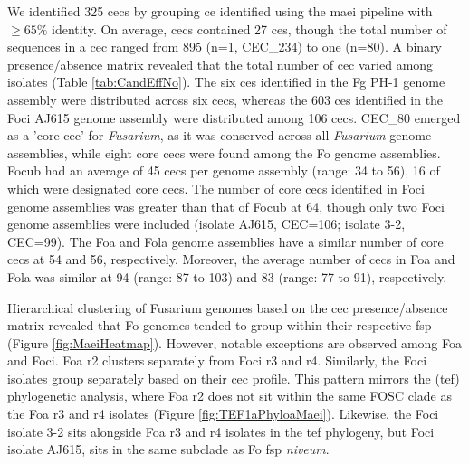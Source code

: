 We identified 325 \acfp{cec} by grouping \ac{ce} identified using the \ac{maei} pipeline with $\geq65\% $ identity. On average, \acp{cec} contained 27 \acp{ce}, though the total number of sequences in a \ac{cec} ranged from 895 (n=1, CEC\_234) to one (n=80). A binary presence/absence matrix revealed that the total number of \ac{cec} varied among isolates (Table \ref{tab:CandEffNo}). The six \acp{ce} identified in the \ac{Fg} PH-1 genome assembly were distributed across six \acp{cec}, whereas the 603 \acp{ce} identified in the \ac{Foci} AJ615 genome assembly were distributed among 106 \acp{cec}. CEC\_80 emerged as a 'core \ac{cec}' for \textit{Fusarium}, as it was conserved across all \textit{Fusarium} genome assemblies, while eight core \acp{cec} were found among the \ac{Fo} genome assemblies. \ac{Focub} had an average of 45 \acp{cec} per genome assembly (range: 34 to 56), 16 of which were designated core \acp{cec}. The number of core \acp{cec} identified in \ac{Foci} genome assemblies was greater than that of \ac{Focub} at 64, though only two \ac{Foci} genome assemblies were included (isolate AJ615, CEC=106; isolate 3-2, CEC=99). The \ac{Foa} and \ac{Fola} genome assemblies have a similar number of core \acp{cec} at 54 and 56, respectively. Moreover, the average number of \acp{cec} in \ac{Foa} and \ac{Fola} was similar at  94 (range: 87 to 103) and 83 (range: 77 to 91), respectively.

Hierarchical clustering of \ac{Fusarium} genomes based on the \ac{cec} presence/absence matrix revealed that \ac{Fo} genomes tended to group within their respective \ac{fsp} (Figure \ref{fig:MaeiHeatmap}). However, notable exceptions are observed among \ac{Foa} and \ac{Foci}. \ac{Foa} \ac{r2} clusters separately from \ac{Foci} \ac{r3} and \ac{r4}. Similarly, the \ac{Foci} isolates group separately based on their \ac{cec} profile. This pattern mirrors the (\ac{tef}) phylogenetic analysis, where \ac{Foa} \ac{r2} does not sit within the same \ac{FOSC} clade as the \ac{Foa} \ac{r3} and \ac{r4} isolates  (Figure \ref{fig:TEF1aPhyloaMaei}). Likewise, the \ac{Foci} isolate 3-2 sits alongside \ac{Foa} \ac{r3} and \ac{r4} isolates in the \ac{tef} phylogeny, but \ac{Foci} isolate AJ615, sits in the same subclade as \ac{Fo} \ac{fsp} \textit{niveum}. 

